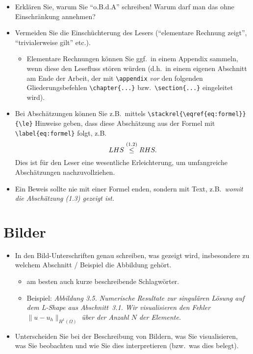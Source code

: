 \documentclass[a4paper,11pt,bibliography=totoc,listof=totoc,headinclude=true,cleardoublepage=empty,oneside]{scrbook}
\begin{document}
{\begin{itemize}
\item Erklären Sie, warum Sie "`o.B.d.A"' schreiben! Warum darf man das ohne Einschrän\-kung annehmen?

\item Vermeiden Sie die Einschüchterung des Lesers ("`elementare Rechnung zeigt"', "`trivialerweise gilt"' etc.).
\begin{itemize}
\item Elementare Rechnungen können Sie ggf.\ in einem Appendix sammeln, wenn diese den Lesefluss stören würden (d.h.\ in einem eigenen Abschnitt am Ende der Arbeit, der mit \verb$\appendix$ \emph{vor} den folgenden Gliederungsbefehlen \verb$\chapter{...}$ bzw.\ \verb$\section{...}$ eingeleitet wird).
\end{itemize}

\item Bei Abschätzungen können Sie z.B.\ mittels \verb$\stackrel{\eqref{eq:formel}}{\le}$ Hinweise geben, dass diese Abschätzung aus der Formel mit \verb$\label{eq:formel}$ folgt, z.B. 
$$LHS \stackrel{\normalfont(1.2)}{\le} RHS.$$ 
Dies ist für den Leser eine wesentliche Erleichterung, um umfangreiche Abschätzungen nachzuvollziehen.

\item Ein Beweis sollte nie mit einer Formel enden, sondern mit Text, z.B.\ \emph{womit die Abschätzung {\normalfont(1.3)} gezeigt ist.}
\end{itemize}
}

\section{Bilder}

{\color{change}
\begin{itemize}
\item In den Bild-Unterschriften genau schreiben, was gezeigt wird, insbesondere zu welchem Abschnitt / Beispiel die Abbildung gehört.
\begin{itemize}
\item am besten auch kurze beschreibende Schlagwörter.
\item Beispiel: \emph{Abbildung 3.5. Numerische Resultate zur singulären Lösung auf dem L-Shape aus  Abschnitt~3.1. Wir visualisieren den Fehler $\|u-u_h\|_{H^1(\Omega)}$ über der Anzahl $N$ der Elemente.}
\end{itemize}

\item Unterscheiden Sie bei der Beschreibung von Bildern, was Sie visualisieren, was Sie beobachten und wie Sie dies interpretieren (bzw.\ was dies belegt).

\end{itemize}
}
\end{document}
